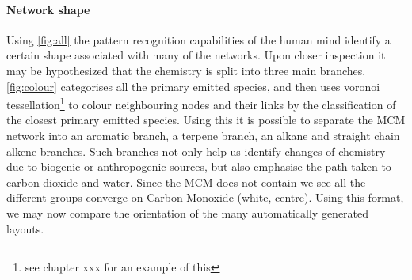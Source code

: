\paragraph{Network shape}\label{sec:netshape}
Using \autoref{fig:all} the pattern recognition capabilities of the human mind identify a certain shape associated with many of the networks. Upon closer inspection it may be hypothesized that the chemistry is split into three main branches. \autoref{fig:colour} categorises all the primary emitted species, and then uses voronoi tessellation\footnote{see chapter xxx for an example of this} to colour neighbouring nodes and their links by the classification of the closest primary emitted species. Using this it is possible to separate the MCM network into an aromatic branch, a terpene branch, an alkane and straight chain alkene branches. Such branches not only help us identify changes of chemistry due to biogenic or anthropogenic sources, but also emphasise the path taken to carbon dioxide and water. Since the MCM does not contain  we see all the different groups converge on Carbon Monoxide (white, centre). Using this format, we may now compare the orientation of the many automatically generated layouts.  
 
